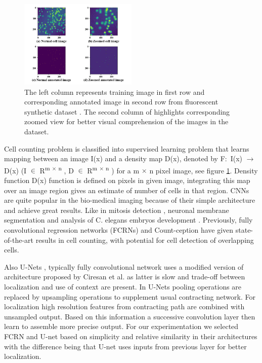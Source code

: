 \documentclass[conference]{IEEEtran}
\begin{document}
\begin{figure}[!h]
\centering
\includegraphics[width=0.50\textwidth]{cells-fig-compared.png}
\caption{The left column represents training image in first row and corresponding annotated image in second row from fluorescent synthetic dataset \cite{b29}. The second column of highlights corresponding zoomed view for better visual comprehension of the images in the dataset.}
\label{fig2}
\end{figure}

Cell counting \cite{b15} problem is classified into supervised learning problem that learns mapping between an image I(x) and a density map D(x), denoted by F$\colon$ I(x) $\rightarrow$ D(x) (I $\in$ R\textsuperscript{m $\times$ n} , D $\in$ R\textsuperscript{m $\times$ n} ) for a m $\times$ n pixel image, see figure \ref{fig2}. Density function D(x) function is defined on pixels in given image, integrating this map over an image region gives an estimate of number of cells in that region.  CNNs \cite{b24, b25} are quite popular in the bio-medical imaging because of their simple architecture and achieve great results. Like in mitosis detection \cite{b26}, neuronal membrane segmentation \cite{b27} and analysis of C. elegans embryos development \cite{b28}. Previously, fully convolutional regression networks (FCRNs) and Count-ception have given state-of-the-art results in cell counting, with potential for cell detection of overlapping cells.

Also U-Nets \cite{b8}, typically fully convolutional network uses a modified version of architecture proposed by Ciresan et al. \cite{b27} as latter is slow and trade-off between localization and use of context are present. In U-Nets pooling operations are replaced by upsampling operations to supplement usual contracting network. For localization high resolution features from contracting path are combined with unsampled output. Based on this information a successive convolution layer then learn to assemble more precise output. For our experimentation we selected FCRN and U-net based on simplicity and relative similarity in their architectures with the difference being that U-net uses inputs from previous layer for better localization.
\end{document}
